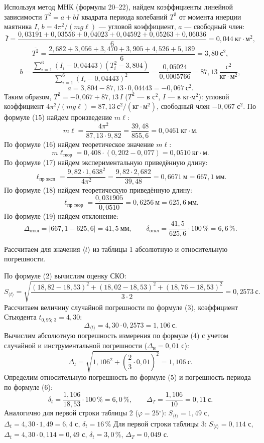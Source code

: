 \documentclass[11pt,a4paper]{article}
\newcommand{\sect}[1]{\par\vspace{10pt}{\large #1}\par\vspace{4pt}}
\newcommand{\gr}{\ensuremath{^\circ}}
\newcommand{\sub}[1]{\text{#1}}
\begin{document}
Используя метод МНК (формулы 20–22), найдем коэффициенты линейной зависимости $T^2=a+bI$ квадрата периода колебаний $T^2$ от момента инерции маятника $I$, $b=4\pi^2/(mg\ell)$ — угловой коэффициент, $a$ — свободный член:
\[
\bar I=\frac{0,03191+0,03556+0,04023+0,04592+0,05263+0,06036}{6}=0,044\ \text{кг}\cdot\text{м}^2,
\]
\[
\overline{T^2}=\frac{2,682+3,056+3,470+3,905+4,526+5,189}{6}=3,80\ \text{с}^2,
\]
\[
b=\frac{\sum\limits_{i=1}^{6}(I_i-0,04443)(T_i^2-3,804)}{\sum\limits_{i=1}^{6}(I_i-0,04443)^2}
=\frac{0,05024}{0,0005766}=87,13\ \frac{\text{с}^2}{\text{кг}\cdot\text{м}^2},
\]
\[
a=3,804-87,13\cdot0,04443=-0,067\ \text{с}^2.
\]
Таким образом, $T^2=-0,067+87,13\,I$ ($T^2$ — в с$^2$, $I$ — в кг$\cdot$м$^2$): угловой коэффициент
$4\pi^2/(mg\ell)=87,13\ \text{с}^2/(\text{кг}\cdot\text{м}^2)$, свободный член $-0,067$ с$^2$.
По формуле (15) найдем произведение $m\ell$:
\[
m\ell=\frac{4\pi^2}{87,13\cdot9,82}=\frac{39,48}{855,6}=0,0461\ \text{кг}\cdot\text{м}.
\]
По формуле (16) найдем теоретическое значение $m\ell$:
\[
m\ell_\sub{теор}=0,408\cdot(0,202-0,077)=0,0510\ \text{кг}\cdot\text{м}.
\]
По формуле (17) найдем экспериментальную приведённую длину:
\[
\ell_\sub{пр эксп}=\frac{9,82\cdot1,638^2}{4\pi^2}=\frac{9,82\cdot2,682}{39,48}=0,6671\ \text{м}=667,1\ \text{мм}.
\]
По формуле (18) найдем теоретическую приведённую длину:
\[
\ell_\sub{пр теор}=\frac{0,031905}{0,0510}=0,6256\ \text{м}=625,6\ \text{мм}.
\]
По формуле (19) найдем отклонение:
\[
\Delta_\sub{откл}=|667,1-625,6|=41,5\ \text{мм},\qquad
\delta_\sub{откл}=\frac{41,5}{625,6}\cdot100\,\%=6,6\,\%.
\]

\sect{10. Расчет погрешностей измерений (для прямых и косвенных измерений).}

Рассчитаем для значения $\langle t\rangle$ из таблицы 1 абсолютную и относительную погрешности.

По формуле (2) вычислим оценку СКО:
\[
S_{\langle t\rangle}=\sqrt{\frac{(18,82-18,53)^2+(18,02-18,53)^2+(18,76-18,53)^2}{3\cdot2}}=0,2573\ \text{с}.
\]
Рассчитаем величину случайной погрешности по формуле (3), коэффициент Стьюдента $t_{0,95;\,3}=4,30$:
\[
\Delta_{\langle t\rangle}=4,30\cdot0,2573=1,106\ \text{с}.
\]
Вычислим абсолютную погрешность измерения по формуле (4) с учетом случайной и инструментальной погрешности ($\Delta_\sub{и}=0,01$ с):
\[
\Delta_t=\sqrt{1,106^2+\left(\frac{2}{3}\cdot0,01\right)^2}=1,106\ \text{с}.
\]
Определим относительную погрешность по формуле (5) и погрешность периода по формуле (6):
\[
\delta_t=\frac{1,106}{18,53}\cdot100\,\%=6,0\,\%,\qquad \Delta_T=\frac{1,106}{10}=0,11\ \text{с}.
\]
Аналогично для первой строки таблицы 2 ($\varphi=25\gr$): \newline 
$S_{\langle t\rangle}=1,49$ с, $\Delta_t=4,30\cdot1,49=6,4$ с,
$\delta_t=16\,\%$ \newline 
Для первой строки таблицы 3: \newline
$S_{\langle t\rangle}=0,114$ с, $\Delta_t=4,30\cdot0,114=0,49$ с,
$\delta_t=3,0\,\%$, $\Delta_T=0,049$ с.
\end{document}
